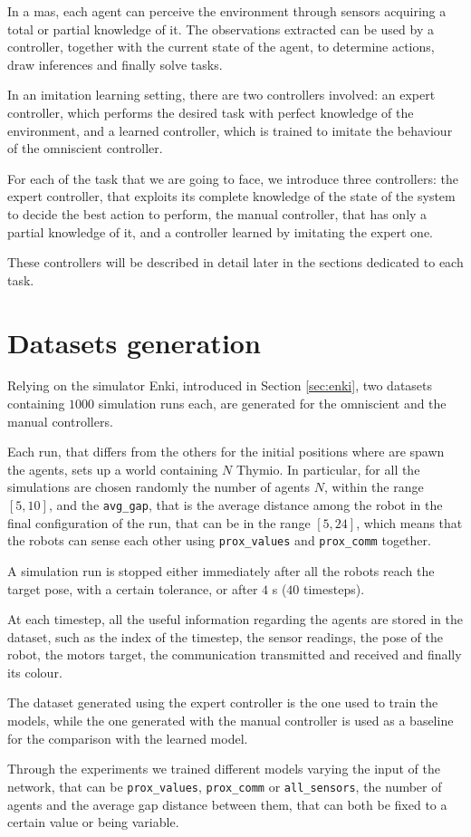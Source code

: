 In a \gls{mas}, each agent can perceive the environment through sensors 
acquiring a total or partial knowledge of it. The observations extracted can be 
used by a controller, together with the current state of the agent, to determine 
actions, draw inferences and finally solve tasks. 

In an imitation learning setting, there are two controllers involved: an expert 
controller, which performs the desired task with perfect knowledge of the 
environment, and a learned controller, which is trained to imitate the behaviour 
of the omniscient controller.

For each of the task that we are going to face, we introduce three controllers: the 
expert controller, that exploits its complete knowledge of the state of the system 
to decide the best action to perform, the manual controller, that has only a partial 
knowledge of it, and a controller learned by imitating the expert one.

These controllers will be described in detail later in the sections dedicated to each 
task.

\section{Datasets generation}
\label{sec:dataset}

Relying on the simulator Enki, introduced in Section \ref{sec:enki}, two datasets 
containing $1000$ simulation runs each, are generated for the omniscient and 
the manual controllers. 

Each run, that differs from the others for the initial positions where are spawn the 
agents, sets up a world containing $N$ Thymio. 
In particular, for all the simulations are chosen randomly the number of agents 
$N$, within the range $[5, 10]$, and the \texttt{avg\_gap}, that is the average 
distance among the robot in the final configuration of the run, that can be in the 
range $[5, 24]$, which means that the robots can sense each other using 
\texttt{prox\_values} and \texttt{prox\_comm} together.

A simulation run is stopped either immediately after all the robots reach the 
target pose, with a certain tolerance, or after $4$ \gls{s} ($40$ timesteps).

At each timestep, all the useful information regarding the agents are stored in the 
dataset, such as the index of the timestep, the sensor readings, the pose of the 
robot, the motors target, the communication transmitted and received and finally 
its colour.

The dataset generated using the expert controller is the one used to train the 
models, while the one generated with the manual controller is used as a baseline 
for the comparison with the learned model.

Through the experiments we trained different models varying the input of the 
network, that can be \texttt{prox\_values}, \texttt{prox\_comm} or 
\texttt{all\_sensors}, the number of agents and the average gap distance between 
them, that can both be fixed to a certain value or being variable.



